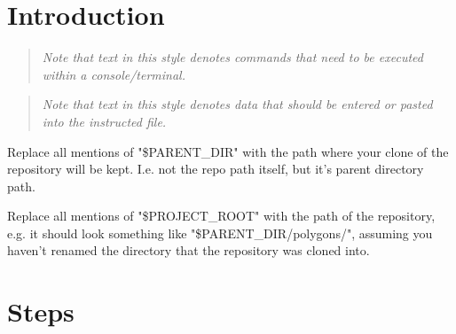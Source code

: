 \documentclass[12pt]{article}
\newenvironment{command}
   { 
      \begin{quote}\itshape
      \color{blue}
   }
   { \end{quote} }
\newenvironment{data}
   { 
      \begin{quote}\itshape
      \color{red}
   }
   { \end{quote} }
\begin{document}
\section{Introduction}

\begin{command} Note that text in this style denotes commands that need to be
executed within a console/terminal. \end{command}

\begin{data} Note that text in this style denotes data that should be entered or
pasted into the instructed file. \end{data}

Replace all mentions of "\$PARENT\_DIR" with the path where your clone of the
repository will be kept. I.e. not the repo path itself, but it's parent
directory path.

Replace all mentions of "\$PROJECT\_ROOT" with the path of the repository, e.g.
it should look something like "\$PARENT\_DIR/polygons/", assuming you haven't
renamed the directory that the repository was cloned into.

\section{Steps}
\end{document}
